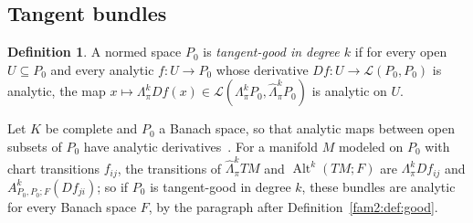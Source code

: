 \documentclass[11pt]{amsart}
\theoremstyle{definition}
\newtheorem{definition}[theorem]{Definition}
\theoremstyle{remark}
\numberwithin{equation}{section}
\newcommand{\cL}{\mathcal L}
\newcommand{\Alt}{\operatorname{Alt}}
\theoremstyle{plain}
\theoremstyle{definition}
\theoremstyle{plain}
\newcommand{\hLambda}{\widehat\Lambda}
\begin{document}
\subsection{Tangent bundles}\label{fam2:ssec:tangent}

\begin{definition}\label{fam2:def:tangent}
A normed space $P_0$ is \emph{tangent-good in degree $k$} if for every open $U\subseteq P_0$ and every analytic
$f\colon U\to P_0$ whose derivative $Df\colon U\to\cL(P_0,P_0)$ is analytic, the map
$x\mapsto\Lambda^k_\pi Df(x)\in\cL(\Lambda^k_\pi P_0,\hLambda^k_\pi P_0)$ is analytic on $U$.
\end{definition}

Let $K$ be complete and $P_0$ a Banach space, so that analytic maps between open subsets of $P_0$ have analytic
derivatives~\cite{Bou}. For a manifold $M$ modeled on $P_0$ with chart transitions $f_{ij}$, the transitions of
$\hLambda^k_\pi TM$ and $\Alt^k(TM;F)$ are $\Lambda^k_\pi Df_{ij}$ and $A^k_{P_0,P_0;F}(Df_{ji})$; so if $P_0$ is
tangent-good in degree $k$, these bundles are analytic for every Banach space $F$, by the paragraph after
Definition~\ref{fam2:def:good}.
\end{document}
